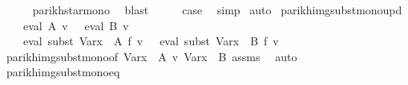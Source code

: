 \begin{isabellebody}
\ \ \ \ \isamarkupfalse%
\ parikh{\isacharunderscore}{\kern0pt}star{\isacharunderscore}{\kern0pt}mono\ \isamarkupfalse%
\ blast\isanewline
\ \ \isamarkupfalse%
\ \isamarkupfalse%
\ {\isacharquery}{\kern0pt}case\ \isamarkupfalse%
\ simp\isanewline
{}\isamarkupfalse%
\ auto%
\endisatagproof
{\isafoldproof}%
%
\isadelimproof
\isanewline
%
\endisadelimproof
\isanewline
{}\isamarkupfalse%
\ parikh{\isacharunderscore}{\kern0pt}img{\isacharunderscore}{\kern0pt}subst{\isacharunderscore}{\kern0pt}mono{\isacharunderscore}{\kern0pt}upd{\isacharcolon}{\kern0pt}\isanewline
\ \ \ {\isachardoublequoteopen}{\isasymPsi}\ {\isacharparenleft}{\kern0pt}eval\ A\ v{\isacharparenright}{\kern0pt}\ {\isasymsubseteq}\ {\isasymPsi}\ {\isacharparenleft}{\kern0pt}eval\ B\ v{\isacharparenright}{\kern0pt}{\isachardoublequoteclose}\isanewline
\ \ \ {\isachardoublequoteopen}{\isasymPsi}\ {\isacharparenleft}{\kern0pt}eval\ {\isacharparenleft}{\kern0pt}subst\ {\isacharparenleft}{\kern0pt}Var{\isacharparenleft}{\kern0pt}x\ {\isacharcolon}{\kern0pt}{\isacharequal}{\kern0pt}\ A{\isacharparenright}{\kern0pt}{\isacharparenright}{\kern0pt}\ f{\isacharparenright}{\kern0pt}\ v{\isacharparenright}{\kern0pt}\ {\isasymsubseteq}\ {\isasymPsi}\ {\isacharparenleft}{\kern0pt}eval\ {\isacharparenleft}{\kern0pt}subst\ {\isacharparenleft}{\kern0pt}Var{\isacharparenleft}{\kern0pt}x\ {\isacharcolon}{\kern0pt}{\isacharequal}{\kern0pt}\ B{\isacharparenright}{\kern0pt}{\isacharparenright}{\kern0pt}\ f{\isacharparenright}{\kern0pt}\ v{\isacharparenright}{\kern0pt}{\isachardoublequoteclose}\isanewline
%
\isadelimproof
\ \ %
\endisadelimproof
%
\isatagproof
{}\isamarkupfalse%
\ parikh{\isacharunderscore}{\kern0pt}img{\isacharunderscore}{\kern0pt}subst{\isacharunderscore}{\kern0pt}mono{\isacharbrackleft}{\kern0pt}of\ {\isachardoublequoteopen}Var{\isacharparenleft}{\kern0pt}x\ {\isacharcolon}{\kern0pt}{\isacharequal}{\kern0pt}\ A{\isacharparenright}{\kern0pt}{\isachardoublequoteclose}\ v\ {\isachardoublequoteopen}Var{\isacharparenleft}{\kern0pt}x\ {\isacharcolon}{\kern0pt}{\isacharequal}{\kern0pt}\ B{\isacharparenright}{\kern0pt}{\isachardoublequoteclose}{\isacharbrackright}{\kern0pt}\ assms\ \isamarkupfalse%
\ auto%
\endisatagproof
{\isafoldproof}%
%
\isadelimproof
\isanewline
%
\endisadelimproof
\isanewline
{}\isamarkupfalse%
\ parikh{\isacharunderscore}{\kern0pt}img{\isacharunderscore}{\kern0pt}subst{\isacharunderscore}{\kern0pt}mono{\isacharunderscore}{\kern0pt}eq{\isacharcolon}{\kern0pt}\isanewline

\end{isabellebody}
